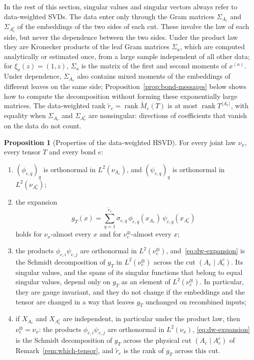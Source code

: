 \documentclass[11pt]{article}
\newcommand{\rank}{\operatorname{rank}}
\theoremstyle{definition}
\newtheorem{proposition}[theorem]{Proposition}
\numberwithin{equation}{section}
\begin{document}
In the rest of this section, singular values and singular vectors always refer to data-weighted SVDs. The data enter only through the Gram matrices $\Sigma_{A_e}$ and $\Sigma_{A_e^c}$ of the embeddings of the two sides of each cut. These involve the law of each side, but never the dependence between the two sides. Under the product law they are Kronecker products of the leaf Gram matrices $\Sigma_a$, which are computed analytically or estimated once, from a large sample independent of all other data; for $\xi_a(z)=(1,z)$, $\Sigma_a$ is the matrix of the first and second moments of $x^{(a)}$. Under dependence, $\Sigma_{A_e}$ also contains mixed moments of the embeddings of different leaves on the same side; Proposition~\ref{prop:bond-messages} below shows how to compute the decomposition without forming these exponentially large matrices. The data-weighted rank $\tilde r_e=\rank\tilde M_e(T)$ is at most $\rank T^{\langle A_e\rangle}$, with equality when $\Sigma_{A_e}$ and $\Sigma_{A_e^c}$ are nonsingular: directions of coefficients that vanish on the data do not count.

\begin{proposition}[Properties of the data-weighted HSVD]\label{prop:dw-hsvd}
For every joint law $\nu_x$, every tensor $T$ and every bond $e$:
\begin{enumerate}[label=(\roman*),nosep]
\item $(\phi_{e,q})_q$ is orthonormal in $L^2(\nu_{A_e})$, and $(\psi_{e,q})_q$ is orthonormal in $L^2(\nu_{A_e^c})$;
\item the expansion
\begin{equation}\label{eq:dw-expansion}
g_T(x)=\sum_{q=1}^{\tilde r_e}\sigma_{e,q}\,\phi_{e,q}(x_{A_e})\,\psi_{e,q}(x_{A_e^c})
\end{equation}
holds for $\nu_x$-almost every $x$ and for $\nu^\otimes_e$-almost every $x$;
\item the products $\phi_{e,i}\psi_{e,j}$ are orthonormal in $L^2(\nu^\otimes_e)$, and~\eqref{eq:dw-expansion} is the Schmidt decomposition of $g_T$ in $L^2(\nu^\otimes_e)$ across the cut $(A_e\mid A_e^c)$. Its singular values, and the spans of its singular functions that belong to equal singular values, depend only on $g_T$ as an element of $L^2(\nu^\otimes_e)$. In particular, they are gauge invariant, and they do not change if the embeddings and the tensor are changed in a way that leaves $g_T$ unchanged on recombined inputs;
\item if $X_{A_e}$ and $X_{A_e^c}$ are independent, in particular under the product law, then $\nu^\otimes_e=\nu_x$: the products $\phi_{e,i}\psi_{e,j}$ are orthonormal in $L^2(\nu_x)$, \eqref{eq:dw-expansion} is the Schmidt decomposition of $g_T$ across the physical cut $(A_e\mid A_e^c)$ of Remark~\ref{rem:which-tensor}, and $\tilde r_e$ is the rank of $g_T$ across this cut.
\end{enumerate}
\end{proposition}
\end{document}
